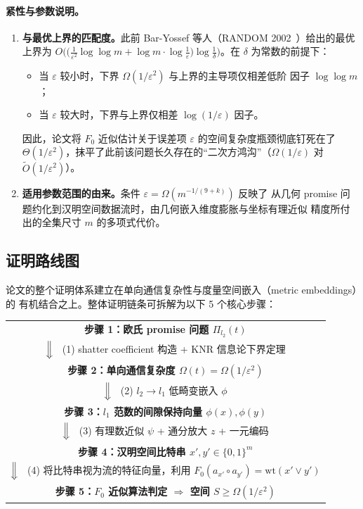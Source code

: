 \documentclass[UTF8, 11pt, a4paper, linestretch=1.15]{ctexart}
\theoremstyle{zhstyle}
\newcommand{\eps}{\varepsilon}
\newcommand{\Fzero}{F_0}
\begin{document}
	\paragraph{紧性与参数说明。}
	\begin{enumerate}
		\item \textbf{与最优上界的匹配度。}此前 Bar-Yossef 等人（RANDOM
		2002~\cite{BJKST02}）给出的最优上界为
		$O\big(\big(\tfrac{1}{\eps^2}\log\log m + \log m \cdot \log\tfrac{1}{\eps}\big)
		\log\tfrac{1}{\delta}\big)$。在 $\delta$ 为常数的前提下：
		\begin{itemize}
			\item 当 $\eps$ 较小时，下界 $\Omega(1/\eps^2)$ 与上界的主导项仅相差低阶
			因子 $\log\log m$；
			\item 当 $\eps$ 较大时，下界与上界仅相差 $\log(1/\eps)$ 因子。
		\end{itemize}
		因此，论文将 $\Fzero$ 近似估计关于误差项 $\eps$ 的空间复杂度瓶颈彻底钉死在了
		$\Theta(1/\eps^2)$，抹平了此前该问题长久存在的“二次方鸿沟”（$\Omega(1/\eps)$
		对 $\tilde{O}(1/\eps^2)$）。
		\item \textbf{适用参数范围的由来。}条件 $\eps = \Omega(m^{-1/(9+k)})$ 反映了
		从几何 promise 问题约化到汉明空间数据流时，由几何嵌入维度膨胀与坐标有理近似
		精度所付出的全集尺寸 $m$ 的多项式代价。
	\end{enumerate}
	
	\subsection{证明路线图}
	
	论文的整个证明体系建立在单向通信复杂性与度量空间嵌入（metric embeddings）的
	有机结合之上。整体证明链条可拆解为以下 5 个核心步骤：
	
	\begin{center}
		\small
		\begin{tabular}{c}
			\toprule
			\textbf{步骤 1：欧氏 promise 问题 $\Pi_{l_2}(t)$} \\
			$\Big\Downarrow$ \ (1) shatter coefficient 构造 + KNR 信息论下界定理 \\
			\textbf{步骤 2：单向通信复杂度 $\Omega(t) = \Omega(1/\eps^2)$} \\
			$\Big\Downarrow$ \ (2) $l_2 \to l_1$ 低畸变嵌入 $\phi$ \\
			\textbf{步骤 3：$l_1$ 范数的间隙保持向量 $\phi(x), \phi(y)$} \\
			$\Big\Downarrow$ \ (3) 有理数近似 $\psi$ + 通分放大 $z$ + 一元编码 \\
			\textbf{步骤 4：汉明空间比特串 $x', y' \in \{0, 1\}^m$} \\
			$\Big\Downarrow$ \ (4) 将比特串视为流的特征向量，利用
			$\Fzero(a_{x'} \circ a_{y'}) = \mathrm{wt}(x' \lor y')$ \\
			\textbf{步骤 5：$\Fzero$ 近似算法判定 $\Rightarrow$ 空间
				$S \geq \Omega(1/\eps^2)$} \\
			\bottomrule
		\end{tabular}
	\end{center}
	
\end{document}
